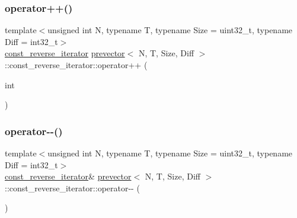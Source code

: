 \mbox{\label{classprevector_1_1const__reverse__iterator_a6e920ffb848590d1637e88b68c6b00ce}} 
\subsubsection{\texorpdfstring{operator++()}{operator++()}\hspace{0.1cm}{\footnotesize\ttfamily [2/2]}}
{\footnotesize\ttfamily template$<$unsigned int N, typename T, typename Size = uint32\+\_\+t, typename Diff = int32\+\_\+t$>$ \\
\mbox{\hyperlink{classprevector_1_1const__reverse__iterator}{const\+\_\+reverse\+\_\+iterator}} \mbox{\hyperlink{classprevector}{prevector}}$<$ N, T, Size, Diff $>$\+::const\+\_\+reverse\+\_\+iterator\+::operator++ (\begin{DoxyParamCaption}\item[{int}]{ }\end{DoxyParamCaption})\hspace{0.3cm}{\ttfamily [inline]}}

\mbox{\label{classprevector_1_1const__reverse__iterator_a1a198a8ca421768877d2feddcd89ac21}} 
\subsubsection{\texorpdfstring{operator-\/-\/()}{operator--()}\hspace{0.1cm}{\footnotesize\ttfamily [1/2]}}
{\footnotesize\ttfamily template$<$unsigned int N, typename T, typename Size = uint32\+\_\+t, typename Diff = int32\+\_\+t$>$ \\
\mbox{\hyperlink{classprevector_1_1const__reverse__iterator}{const\+\_\+reverse\+\_\+iterator}}\& \mbox{\hyperlink{classprevector}{prevector}}$<$ N, T, Size, Diff $>$\+::const\+\_\+reverse\+\_\+iterator\+::operator-\/-\/ (\begin{DoxyParamCaption}{ }\end{DoxyParamCaption})\hspace{0.3cm}{\ttfamily [inline]}}

